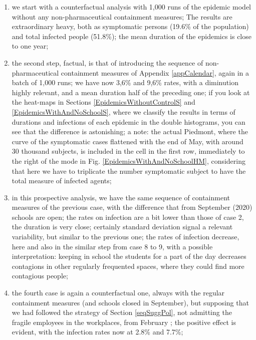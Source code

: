 \documentclass[11pt]{article}
\begin{document}
\begin{enumerate}
\setlength{\itemsep}{0pt}

\item\label{cf1} we start with a counterfactual analysis with 1,000 runs of the epidemic model without any non-pharmaceutical containment measures; The results are extraordinary heavy, both as symptomatic persons (19.6\% of the population) and total infected  people (51.8\%); the mean duration of the epidemics is close to one year;

\item\label{f1}  the second step, factual, is that of introducing the sequence of non-pharmaceutical containment measures of Appendix \ref{appCalendar}, again in a batch of 1,000 runs; we have now 3,6\% and 9,6\% rates, with a diminution highly relevant, and a mean duration half of the preceding one; if you look at the heat-maps in Sections \ref{EpidemicsWithoutControlS} and \ref{EpidemicsWithAndNoSchoolS}, where we classify the results in terms of durations and infections of each epidemic in the double histograms, you can see that the difference is astonishing; a note: the actual Piedmont, where the curve of the symptomatic cases flattened with the end of May, with around 30 thousand subjects, is included in the cell in the first row, immediately to the right of the mode in Fig. \ref{EpidemicsWithAndNoSchoolHM}, considering that here we have to triplicate the number symptomatic subject to have the total measure of infected agents;

\item\label{f2} in this prospective analysis, we have the same sequence of containment measures of the previous case, with the difference that from September  (2020) schools are open; the rates on infection are a bit lower than those of case 2, the duration is very close; certainly standard deviation signal a relevant variability, but similar to the previous one; the rates of infection decrease, here and also in the similar step from case 8 to 9, with a possible interpretation: keeping in school the students for a part of the day decreases contagions in other regularly frequented spaces, where they could find more contagious people;

\item\label{cf2} the fourth case is again a counterfactual one, always with the regular containment measures (and schools closed in September), but supposing that we had followed the strategy of Section \ref{seqSuggPol}, not admitting the fragile employees in the workplaces, from February ; the positive effect is evident, with the infection rates now at 2.8\% and 7.7\%;


\end{enumerate}
\end{document}
